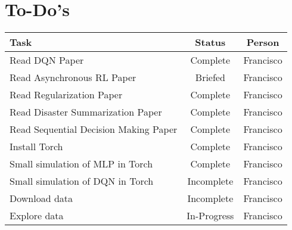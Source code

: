 \documentclass[12pt]{article}
\begin{document}
\section{To-Do's}
\center
\begin{tabular}{ l | c | c  }
	\hline
	Task  & Status  & Person\\ \hline
  	Read DQN Paper \cite{MnihKSGAWR13}  & Complete  & Francisco \\
	Read Asynchronous RL Paper \cite{DBLP:journals/corr/MnihBMGLHSK16} & Briefed  & Francisco \\
	Read  Regularization Paper \cite{chen2012marginalized} & Complete  & Francisco \\
	Read  Disaster Summarization Paper \cite{kedzie2015predicting} & Complete  & Francisco \\
	Read  Sequential Decision Making Paper \cite{kedzie2016real} & Complete  & Francisco \\
	Install Torch & Complete  & Francisco \\
	Small simulation of MLP in Torch & Complete  & Francisco \\
	Small simulation of DQN in Torch & Incomplete  & Francisco \\
	Download data & Incomplete  & Francisco \\
	Explore data & In-Progress  & Francisco \\
	\hline
\end{tabular}


\end{document}
